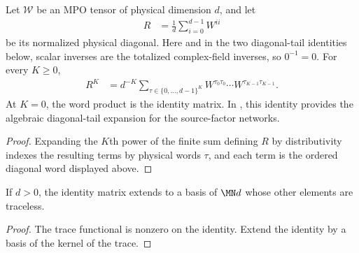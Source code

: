 \begin{lemma}
    \label{thm:mpu_normalized_diagonal_word_expansion}
    \leanok
    Let $\mathcal W$ be an MPO tensor of physical dimension $d$, and
    let
    \begin{align}
        R & =\frac1d\sum_{i=0}^{d-1}W^{ii}
    \end{align}
    be its normalized physical diagonal.  Here and in the two diagonal-tail
    identities below, scalar inverses are the totalized complex-field inverses,
    so $0^{-1}=0$.  For every $K\geq0$,
    \begin{align}
        R^K
         & =d^{-K}\sum_{\tau\in\{0,\ldots,d-1\}^K}
        W^{\tau_0\tau_0}\cdots W^{\tau_{K-1}\tau_{K-1}}.
    \end{align}
    At $K=0$, the word product is the identity matrix.  In \cite[Theorem~III.8, Section~III.B, equations~(31)--(32)]{Cirac2017MPU}, this identity provides the algebraic
    diagonal-tail expansion for the source-factor
    networks.
\end{lemma}

\begin{proof}\leanok
    Expanding the $K$th power of the finite sum defining $R$ by distributivity
    indexes the resulting terms by physical words $\tau$, and each term is
    the ordered diagonal word displayed above.
\end{proof}

\begin{lemma}
    \label{thm:identity_traceless_matrix_basis}
    \leanok
    If $d>0$, the identity matrix extends to a basis of $\MN d$ whose other
    elements are traceless.
\end{lemma}

\begin{proof}\leanok
    The trace functional is nonzero on the identity. Extend the identity by a
    basis of the kernel of the trace.
\end{proof}

